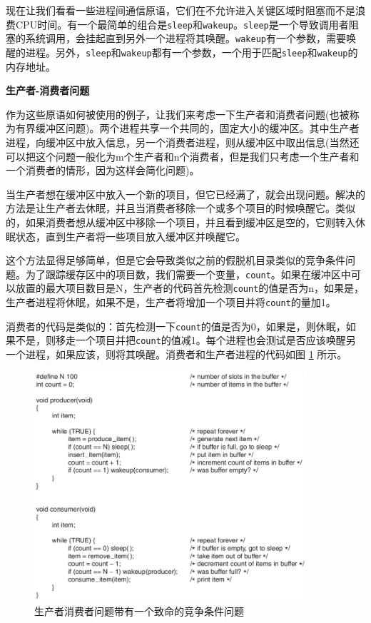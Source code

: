 	现在让我们看看一些进程间通信原语，它们在不允许进入关键区域时阻塞而不是浪费CPU时间。有一个最简单的组合是\texttt{sleep}和\texttt{wakeup}。\texttt{sleep}是一个导致调用者阻塞的系统调用，会挂起直到另外一个进程将其唤醒。\texttt{wakeup}有一个参数，需要唤醒的进程。另外，\texttt{sleep}和\texttt{wakeup}都有一个参数，一个用于匹配\texttt{sleep}和\texttt{wakeup}的内存地址。
	
	\textbf{生产者-消费者问题}
	
	作为这些原语如何被使用的例子，让我们来考虑一下生产者和消费者问题(也被称为有界缓冲区问题)。两个进程共享一个共同的，固定大小的缓冲区。其中生产者进程，向缓冲区中放入信息，另一个消费者进程，则从缓冲区中取出信息(当然还可以把这个问题一般化为m个生产者和n个消费者，但是我们只考虑一个生产者和一个消费者的情形，因为这样会简化问题)。
	
	当生产者想在缓冲区中放入一个新的项目，但它已经满了，就会出现问题。解决的方法是让生产者去休眠，并且当消费者移除一个或多个项目的时候唤醒它。类似的，如果消费者想从缓冲区中移除一个项目，并且看到缓冲区是空的，它则转入休眠状态，直到生产者将一些项目放入缓冲区并唤醒它。
	
	这个方法显得足够简单，但是它会导致类似之前的假脱机目录类似的竞争条件问题。为了跟踪缓存区中的项目数，我们需要一个变量，\texttt{count}。如果在缓冲区中可以放置的最大项目数目是N，生产者的代码首先检测\texttt{count}的值是否为n，如果是，生产者进程将休眠，如果不是，生产者将增加一个项目并将\texttt{count}的量加1。
	
	消费者的代码是类似的：首先检测一下\texttt{count}的值是否为0，如果是，则休眠，如果不是，则移走一个项目并把\texttt{count}的值减1。每个进程也会测试是否应该唤醒另一个进程，如果应该，则将其唤醒。消费者和生产者进程的代码如图 \ref{fig:producerconsumer} 所示。
	
	\begin{figure}[ht]\small
		\centering
		\includegraphics[width=0.90\textwidth]{FIG/2-27.png}
		\caption{生产者消费者问题带有一个致命的竞争条件问题}\label{fig:producerconsumer}
	\end{figure}
	
